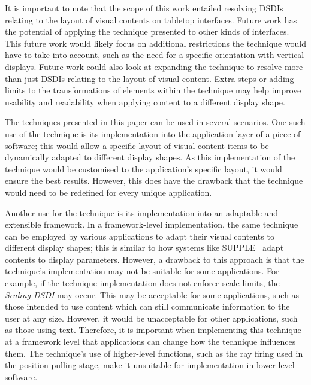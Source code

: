 \documentclass[twocolumn,compsoc]{cvm}
\begin{document}
{It is important to note that the scope of this work entailed resolving \acp{DSDI} relating to the layout of visual contents on tabletop interfaces.
Future work has the potential of applying the technique presented to other kinds of interfaces.
This future work would likely focus on additional restrictions the technique would have to take into account, such as the need for a specific orientation with vertical displays.
Future work could also look at expanding the technique to resolve more than just \acp{DSDI} relating to the layout of visual content.
Extra steps or adding limits to the transformations of elements within the technique may help improve usability and readability when applying content to a different display shape.

The techniques presented in this paper can be used in several scenarios.
One such use of the technique is its implementation into the application layer of a piece of software; this would allow a specific layout of visual content items to be dynamically adapted to different display shapes.
As this implementation of the technique would be customised to the application's specific layout, it would ensure the best results.
However, this does have the drawback that the technique would need to be redefined for every unique application.

Another use for the technique is its implementation into an adaptable and extensible framework.
In a framework-level implementation, the same technique can be
employed by various applications to adapt their visual contents to different display shapes; this is similar to how systems like SUPPLE~\cite{Gajos2004} adapt contents to display parameters.
However, a drawback to this approach is that the technique's implementation may not be suitable for some applications.  
For example, if the technique implementation does not enforce scale limits, the {\emph{Scaling \ac{DSDI}}} may occur.
This may be acceptable for some applications, such as those intended to use content which can still communicate information to the user at any size.
However, it would be unacceptable for other applications, such as those using text.
Therefore, it is important when implementing this technique at a framework level that applications can change how the technique influences them.
The technique's use of higher-level functions, such as the ray firing used in the position pulling stage, make it unsuitable for implementation in lower level software.

}
\end{document}
